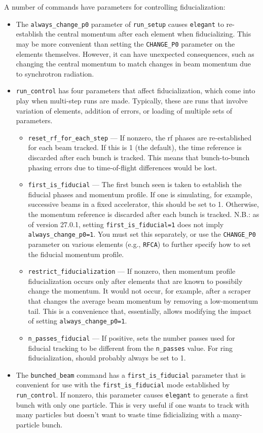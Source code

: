 \documentclass[11pt]{article}
\begin{document}
A number of commands have parameters for controlling fiducialization:
\begin{itemize}
\item The \verb|always_change_p0| parameter of \verb|run_setup| causes
	\verb|elegant| to re-establish the central momentum after each
	element when fiducializing.  This may be more convenient than
	setting the \verb|CHANGE_P0| parameter on the elements themselves.
	However, it can have unexpected consequences, such as changing the
	central momentum to match changes in beam momentum due to synchrotron
	radiation.
\item \verb|run_control| has four parameters that affect fiducialization,
	which come into play when multi-step runs are made.  Typically, these
	are runs that involve variation of elements, addition of errors,
	or loading of multiple sets of parameters.
	\begin{itemize}
	\item \verb|reset_rf_for_each_step| --- If nonzero, the rf phases are 
	re-established
	for each beam tracked.  If this is 1 (the default), 
	the time reference is discarded after each bunch is tracked.
	This means that bunch-to-bunch phasing errors due to time-of-flight 
	differences would be lost.  
	\item \verb|first_is_fiducial| --- The first bunch seen is taken to
	establish the fiducial phases and momentum profile.  If one is simulating,
	for example, successive beams in a fixed accelerator, this should be set
	to 1.  Otherwise, the momentum reference is discarded after each bunch
	is tracked. N.B.: as of version 27.0.1, setting \verb|first_is_fiducial=1| 
        does not imply \verb|always_change_p0=1|. You must set this separately,
        or use the \verb|CHANGE_P0| parameter on various elements (e.g., \verb|RFCA|)
        to further specify how to set the fiducial momentum profile.
	\item \verb|restrict_fiducialization| --- If nonzero, then momentum profile
	fiducialization occurs only after elements that are known to possibily
	change the momentum. It would not occur, for example, after a scraper that
	changes the average beam momentum by removing a low-momentum tail.
        This is a convenience that, essentially, allows modifying the impact
        of setting \verb|always_change_p0=1|.
        \item \verb|n_passes_fiducial| --- If positive, sets the number  passes used
          for fiducial tracking to be different from the \verb|n_passes| value.
          For ring fiducialization, should probably always be set to 1.
	\end{itemize}
\item The \verb|bunched_beam| command has a \verb|first_is_fiducial| parameter
	that is convenient for use with the \verb|first_is_fiducial| mode
	established by \verb|run_control|.  If nonzero, this parameter causes
	\verb|elegant| to generate a first bunch with only one particle.
	This is very useful if one wants to track with many particles but doesn't
	want to waste time fidicializing with a many-particle bunch.
\end{itemize}
\end{document}
